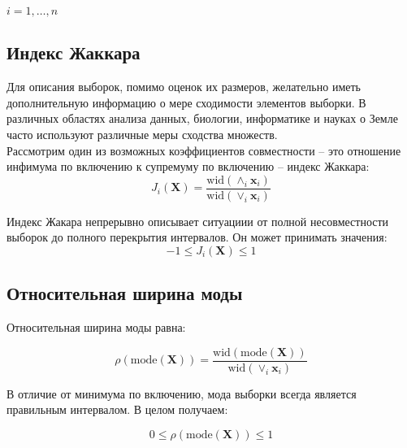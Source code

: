 $i = 1, \ldots, n$ \\

\subsection{Индекс Жаккара} 

Для описания выборок, помимо оценок их размеров, желательно иметь дополнительную информацию о мере сходимости элементов выборки. В различных областях анализа данных, биологии, информатике и науках о Земле часто используют различные меры сходства множеств. \\
Рассмотрим один из возможных коэффициентов совместности -- это отношение инфимума по включению к супремуму по включению -- индекс Жаккара: \\

\begin{equation}
	J_i(\bm{X}) = \dfrac{\text{wid}(\wedge_i \bm{x}_i)}{\text{wid} (\vee_i \bm{x}_i)}
\end{equation}

Индекс Жакара непрерывно описывает ситуациии от полной несовместности выборок до полного перекрытия интервалов. Он может принимать значения: 
\begin{equation*}
	-1 \leq J_i(\bm{X}) \leq 1
\end{equation*}

\subsection{Относительная ширина моды}

Относительная ширина моды равна: 

\begin{equation}
	\rho(\text{mode}(\bm{X})) =\dfrac{\text{wid}(\text{mode}(\bm{X}))}{\text{wid} (\vee_i \bm{x}_i)}
\end{equation}

В отличие от минимума по включению, мода выборки всегда является правильным интервалом. В целом получаем: 

\begin{equation*}
	0 \leq \rho(\text{mode}(\bm{X})) \leq 1
\end{equation*}

\newpage
